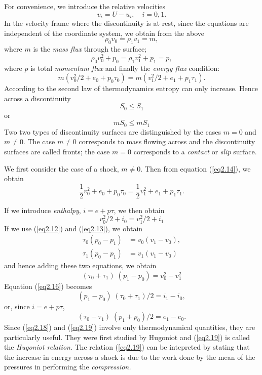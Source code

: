 For convenience, we introduce the relative velocities
$$
v_i = U - u_i, \quad i = 0,1.
$$
In the velocity frame where the discontinuity is at rest, since the equations are independent of the coordinate system, we obtain from the above
\begin{equation*}
\rho_0 v_0 = \rho_1 v_1 = m, \tag{2.12}\label{eq2.12}
\end{equation*}
where $m$ is the {\em mass flux } through the surface;
\begin{equation*}
\rho_0 v^2_0 + p_0 = \rho_1 v^2_1 + p_1 = p, 
\tag{2.13}\label{eq2.13}
\end{equation*}
where $p$ is total {\em momentum flux} and finally the {\em energy flux} condition:
\begin{equation*}
m(v^2_0/2 + e_0 + p_0 \tau_0) = m (v^2_1 /2 + e_1+p_1 \tau_1). 
\tag{2.14}\label{eq2.14}
\end{equation*}
According to the second law of thermodynamics entropy can only increase. Hence across a discontinuity
$$
S_0 \leq S_1
$$ 
or
\begin{equation*}
mS_0 \leq mS_1\tag{2.15}\label{eq2.15}
\end{equation*}
Two two types of discontinuity surfaces are distinguished by  the cases $m = 0$ and $m \neq 0$. The case $m \neq 0$ corresponds to mass flowing across and the discontinuity surfaces are called fronts; the case $m=0$ corresponds to a {\em contact} or {\em slip} surface.

We first consider the case of a shock, $m \neq 0$. Then from equation (\ref{eq2.14}), we obtain 
$$
\frac{1}{2} v^2_0 + e_0  + p_0 \tau_0 = \frac{1}{2} v^2_1 + e_1 + p_1 \tau_1.  
$$

If we introduce {\em enthalpy}, $i=e+p\tau$, we then obtain
\begin{equation*} 
v^2_0 / 2 + i_0 = v^2_1/ 2 + i_1 
\tag{2.16}\label{eq2.16}
\end{equation*}
If we use (\ref{eq2.12}) and (\ref{eq2.13}), we obtain
\begin{align*}
\tau_0 (p_0 - p_1) & = v_0 (v_1 - v_0),\\
\tau_1 (p_0 - p_1) & = v_1 (v_1 - v_0)
\end{align*}
and hence adding these two equations, we obtain
\begin{equation*}
(\tau_0 + \tau_1) \; (p_1 - p_0) = v^2_0 - v^2_1\tag{2.17}\label{eq2.17}
\end{equation*}
Equation (\ref{eq2.16}) becomes
\begin{equation*}
(p_1 - p_0) \; ( \tau_0 + \tau_1) / 2 = i_1 - i_0, 
\tag{2.18}\label{eq2.18}
\end{equation*}
or, since $i=e+p\tau$,
\begin{equation*}
(\tau_0 - \tau_1) \; (p_1 + p_0) / 2 = e_1 - e_0. 
\tag{2.19}\label{eq2.19}
\end{equation*}
Since (\ref{eq2.18}) and (\ref{eq2.19}) involve only thermodynamical quantities, they are particularly useful. They were first studied by Hugoniot and (\ref{eq2.19}) is called the {\em Hugoniot relation}. The relation (\ref{eq2.19}) can be intepreted by stating that the increase in energy across a shock is due to the work done by the mean of the pressures in performing the {\em compression.}

